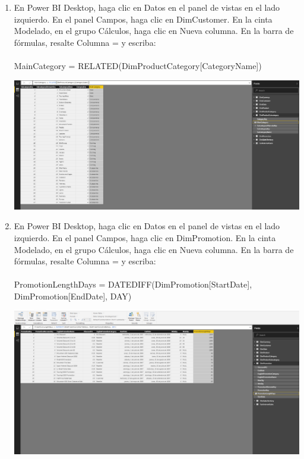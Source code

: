 \begin{enumerate}[1.]
	\item En Power BI Desktop, haga clic en Datos en el panel de vistas en el lado izquierdo. En el panel Campos, haga clic en DimCustomer.  En la cinta Modelado, en el grupo Cálculos, haga clic en Nueva columna. En la barra de fórmulas, resalte Columna = y escriba:
	\\
	\\MainCategory = RELATED(DimProductCategory[CategoryName])\\
			 
	\begin{center}
	\includegraphics[width=17cm]{./Imagenes/36} 
	\end{center}

	\item En Power BI Desktop, haga clic en Datos en el panel de vistas en el lado izquierdo. En el panel Campos, haga clic en DimPromotion.  En la cinta Modelado, en el grupo Cálculos, haga clic en Nueva columna. En la barra de fórmulas, resalte Columna = y escriba:
	\\
	\\PromotionLengthDays = DATEDIFF(DimPromotion[StartDate], DimPromotion[EndDate], DAY)\\
			 
	\begin{center}
	\includegraphics[width=17cm]{./Imagenes/37} 
	\end{center}



\end{enumerate}

